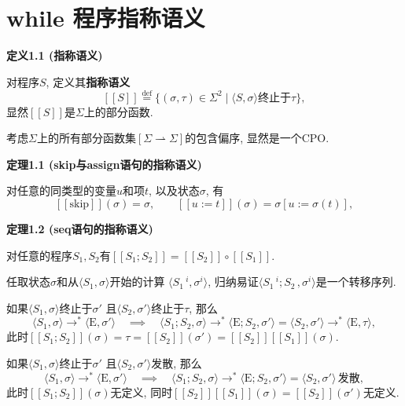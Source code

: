 \documentclass[UTF8]{ctexart}
\begin{document}
\setlength{\abovedisplayskip}{1pt}
\setlength{\belowdisplayskip}{1pt}

\section{while 程序指称语义}

\hypertarget{sec:定义1.1}{}
\noindent\textbf{定义1.1 (指称语义)}

对程序$S$, 定义其\textbf{指称语义}
\[
    [\![S]\!]\overset{\mathrm{def}}{=}\{(\sigma,\tau)\in\Sigma^2
    \mid\langle S,\sigma\rangle\text{终止于}\tau\},
\]
显然$[\![S]\!]$是$\Sigma$上的部分函数.

\vspace{10pt}

考虑$\Sigma$上的所有部分函数集$[\Sigma\rightharpoonup\Sigma]$的包含偏序,
显然是一个CPO.

\vspace{15pt}

\hypertarget{sec:定理1.1}{}
\noindent\textbf{定理1.1 (skip与assign语句的指称语义)}

对任意的同类型的变量$u$和项$t$, 以及状态$\sigma$, 有
\[
    [\![\mathrm{skip}]\!](\sigma)=\sigma,\qquad
    [\![u:=t]\!](\sigma)=\sigma[u:=\sigma(t)],
\]

\vspace{15pt}

\hypertarget{sec:定理1.2}{}
\noindent\textbf{定理1.2 (seq语句的指称语义)}

对任意的程序$S_1,S_2$有$[\![S_1;S_2]\!]=[\![S_2]\!]\circ[\![S_1]\!]$.


任取状态$\sigma$和从$\langle S_1,\sigma\rangle$开始的计算
$\langle S_1\,\!\!^i,\sigma^i\rangle$,
归纳易证$\langle S_1\,\!\!^i;S_2\,,\sigma^i\rangle$是一个转移序列.

如果$\langle S_1,\sigma\rangle$终止于$\sigma'$
且$\langle S_2,\sigma'\rangle$终止于$\tau$, 那么
\[
    \langle S_1,\sigma\rangle\to^*\langle\mathrm{E},\sigma'\rangle
    \quad\implies\quad
    \langle S_1;S_2,\sigma\rangle\to^*\langle\mathrm{E};S_2,\sigma'\rangle=
    \langle S_2,\sigma'\rangle\to^*\langle\mathrm{E},\tau\rangle,
\]
此时$[\![S_1;S_2]\!](\sigma)=\tau=[\![S_2]\!](\sigma')=
[\![S_2]\!][\![S_1]\!](\sigma)$.

如果$\langle S_1,\sigma\rangle$终止于$\sigma'$
且$\langle S_2,\sigma'\rangle$发散, 那么
\[
    \langle S_1,\sigma\rangle\to^*\langle\mathrm{E},\sigma'\rangle
    \quad\implies\quad
    \langle S_1;S_2,\sigma\rangle\to^*\langle\mathrm{E};S_2,\sigma'\rangle=
    \langle S_2,\sigma'\rangle\,\text{发散},
\]
此时$[\![S_1;S_2]\!](\sigma)$无定义, 同时$[\![S_2]\!][\![S_1]\!](\sigma)=
[\![S_2]\!](\sigma')$无定义.
\end{document}
